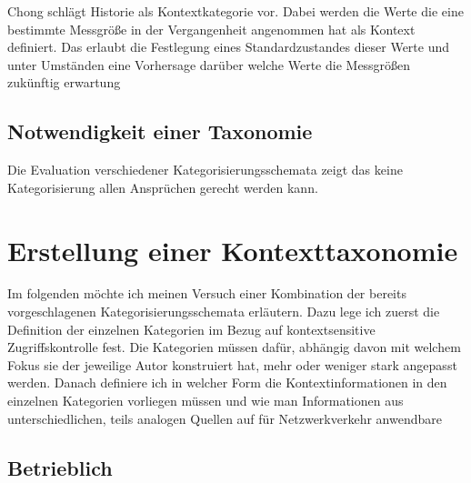 Chong\cite{chong_context-aware_nodate} schlägt Historie als Kontextkategorie vor. Dabei werden die Werte die eine bestimmte Messgröße in der Vergangenheit angenommen hat als Kontext definiert. Das erlaubt die Festlegung eines Standardzustandes dieser Werte und unter Umständen eine Vorhersage darüber welche Werte die Messgrößen zukünftig erwartung
\subsection{Notwendigkeit einer Taxonomie}
Die Evaluation verschiedener Kategorisierungsschemata zeigt das keine Kategorisierung allen Ansprüchen gerecht werden kann\cite{perera_context_2014}.

\section{ Erstellung einer Kontexttaxonomie }
Im folgenden möchte ich meinen Versuch einer Kombination der bereits vorgeschlagenen Kategorisierungsschemata erläutern. Dazu lege ich zuerst die Definition der einzelnen Kategorien im Bezug auf kontextsensitive Zugriffskontrolle fest. Die Kategorien müssen dafür, abhängig davon mit welchem Fokus sie der jeweilige Autor konstruiert hat, mehr oder weniger stark angepasst werden. Danach definiere ich in welcher Form die Kontextinformationen in den einzelnen Kategorien vorliegen müssen und wie man Informationen aus unterschiedlichen, teils analogen Quellen auf für Netzwerkverkehr anwendbare  %


\subsection{Betrieblich}

